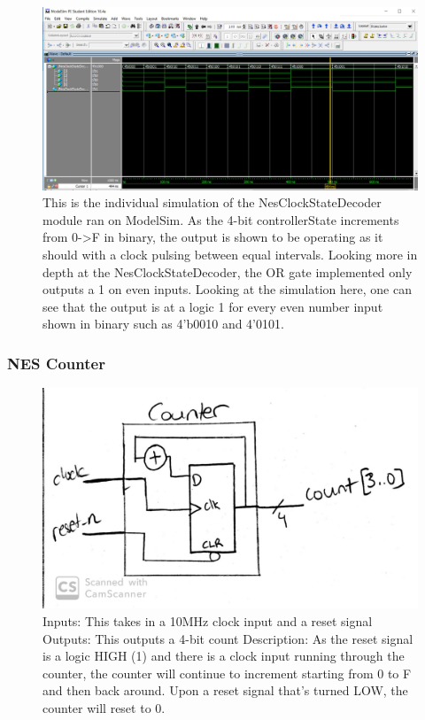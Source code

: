 \documentclass[a4paper]{article}
\begin{document}
\begin{figure}[H]
  \centering
    \includegraphics[width=.85\textwidth]{images/ModelSim/nesclock.JPG}
	\caption{This is the individual simulation of the NesClockStateDecoder module ran on ModelSim. As the 4-bit controllerState increments from 0->F in binary, the output is shown to be operating as it should with a clock pulsing between equal intervals. Looking more in depth at the NesClockStateDecoder, the OR gate implemented only outputs a 1 on even inputs. Looking at the simulation here, one can see that the output is at a logic 1 for every even number input shown in binary such as 4’b0010 and 4’0101.}
    \label{fig:clock_sim}
\end{figure}

\subsubsection{NES Counter}

\begin{figure}[H]
  \centering
    \includegraphics[width=.85\textwidth]{images/block_diagrams/nes/counter5.jpg}
	\caption{Inputs: This takes in a 10MHz clock input and a reset signal 
Outputs: This outputs a 4-bit count
Description: As the reset signal is a logic HIGH (1) and there is a clock input running through the counter, the counter will continue to increment starting from 0 to F and then back around. Upon a reset signal that’s turned LOW, the counter will reset to 0.}
    \label{fig:counter}
\end{figure}
\end{document}
